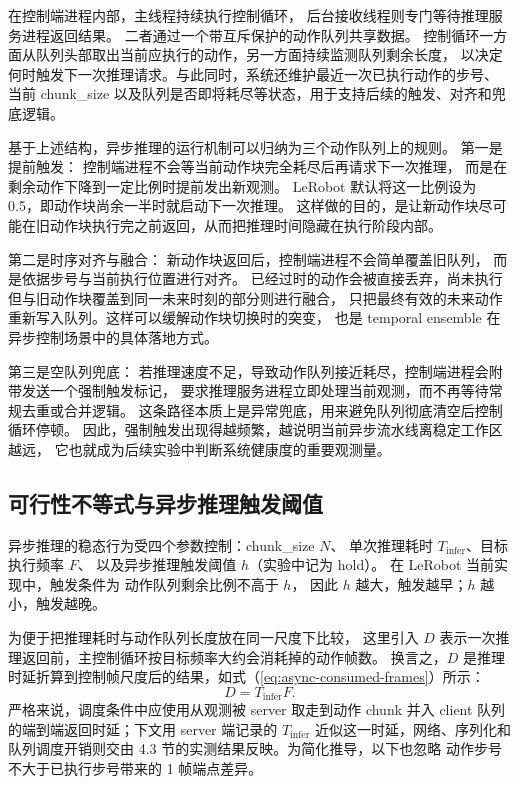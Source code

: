 在控制端进程内部，主线程持续执行控制循环，
后台接收线程则专门等待推理服务进程返回结果。
二者通过一个带互斥保护的动作队列共享数据。
控制循环一方面从队列头部取出当前应执行的动作，另一方面持续监测队列剩余长度，
以决定何时触发下一次推理请求。与此同时，系统还维护最近一次已执行动作的步号、
当前 chunk\_size 以及队列是否即将耗尽等状态，用于支持后续的触发、对齐和兜底逻辑。

基于上述结构，异步推理的运行机制可以归纳为三个动作队列上的规则。
第一是提前触发：
控制端进程不会等当前动作块完全耗尽后再请求下一次推理，
而是在剩余动作下降到一定比例时提前发出新观测。
LeRobot 默认将这一比例设为 0.5，即动作块尚余一半时就启动下一次推理。
这样做的目的，是让新动作块尽可能在旧动作块执行完之前返回，从而把推理时间隐藏在执行阶段内部。

第二是时序对齐与融合：
新动作块返回后，控制端进程不会简单覆盖旧队列，
而是依据步号与当前执行位置进行对齐。
已经过时的动作会被直接丢弃，尚未执行但与旧动作块覆盖到同一未来时刻的部分则进行融合，
只把最终有效的未来动作重新写入队列。这样可以缓解动作块切换时的突变，
也是 temporal ensemble 在异步控制场景中的具体落地方式。

第三是空队列兜底：
若推理速度不足，导致动作队列接近耗尽，控制端进程会附带发送一个强制触发标记，
要求推理服务进程立即处理当前观测，而不再等待常规去重或合并逻辑。
这条路径本质上是异常兜底，用来避免队列彻底清空后控制循环停顿。
因此，强制触发出现得越频繁，越说明当前异步流水线离稳定工作区越远，
它也就成为后续实验中判断系统健康度的重要观测量。

\subsection{可行性不等式与异步推理触发阈值}\label{sec:async-inf-inequality}

异步推理的稳态行为受四个参数控制：chunk\_size $N$、
单次推理耗时 $T_{\text{infer}}$、目标执行频率 $F$、
以及异步推理触发阈值 $h$（实验中记为 hold）。
在 LeRobot 当前实现中，触发条件为
动作队列剩余比例不高于 $h$，
因此 $h$ 越大，触发越早；$h$ 越小，触发越晚。

为便于把推理耗时与动作队列长度放在同一尺度下比较，
这里引入 $D$ 表示一次推理返回前，主控制循环按目标频率大约会消耗掉的动作帧数。
换言之，$D$ 是推理时延折算到控制帧尺度后的结果，如式（\ref{eq:async-consumed-frames}）所示：
\begin{equation}
  D = T_{\text{infer}}F.
  \label{eq:async-consumed-frames}
\end{equation}
严格来说，调度条件中应使用从观测被 server 取走到动作 chunk
并入 client 队列的端到端返回时延；下文用 server 端记录的
$T_{\text{infer}}$ 近似这一时延，网络、序列化和队列调度开销则交由
4.3 节的实测结果反映。为简化推导，以下也忽略
动作步号不大于已执行步号带来的 1 帧端点差异。

